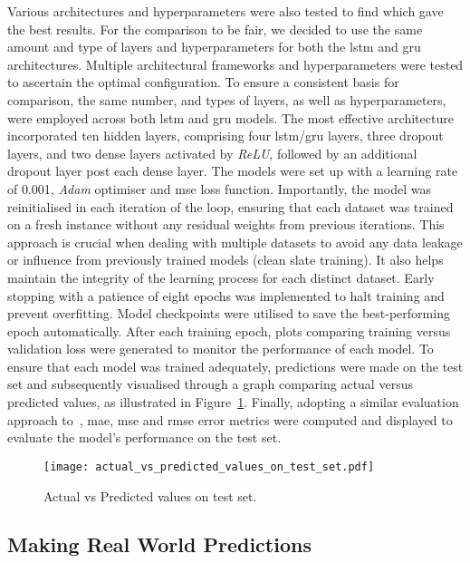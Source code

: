 Various architectures and hyperparameters were also tested to find which gave the best results. For the comparison to be fair, we decided to use the same amount and type of layers and hyperparameters for both the \acrshort{lstm} and \acrshort{gru} architectures. Multiple architectural frameworks and hyperparameters were tested to ascertain the optimal configuration. To ensure a consistent basis for comparison, the same number, and types of layers, as well as hyperparameters, were employed across both \acrshort{lstm} and \acrshort{gru} models. The most effective architecture incorporated ten hidden layers, comprising four \acrshort{lstm}/\acrshort{gru} layers, three dropout layers, and two dense layers activated by \textit{ReLU}, followed by an additional dropout layer post each dense layer. The models were set up with a learning rate of 0.001, \textit{Adam} optimiser and \acrshort{mse} loss function. Importantly, the model was reinitialised in each iteration of the loop, ensuring that each dataset was trained on a fresh instance without any residual weights from previous iterations. This approach is crucial when dealing with multiple datasets to avoid any data leakage or influence from previously trained models (clean slate training). It also helps maintain the integrity of the learning process for each distinct dataset. Early stopping with a patience of eight epochs was implemented to halt training and prevent overfitting. Model checkpoints were utilised to save the best-performing epoch automatically. After each training epoch, plots comparing training versus validation loss were generated to monitor the performance of each model. To ensure that each model was trained adequately, predictions were made on the test set and subsequently visualised through a graph comparing actual versus predicted values, as illustrated in Figure~\ref{fig_3.6}. Finally, adopting a similar evaluation approach to~\cite{23}, \acrshort{mae}, \acrshort{mse} and \acrshort{rmse} error metrics were computed and displayed to evaluate the model's performance on the test set.

\begin{figure}[htbp]
    \centering
    \texttt{[image: actual\_vs\_predicted\_values\_on\_test\_set.pdf]}
    \caption[Short sample caption.]{Actual vs Predicted values on test set.\label{fig_3.6}}
\end{figure}

\subsection{Making Real World Predictions}
\label{subsec:3.3.3}

